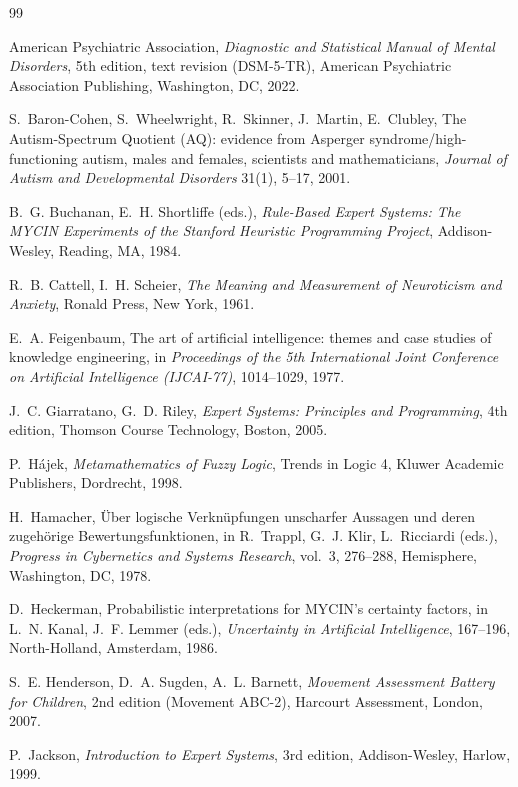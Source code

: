 \begin{thebibliography}{99}

American Psychiatric Association,
\emph{Diagnostic and Statistical Manual of Mental Disorders}, 5th edition, text
revision (DSM-5-TR), American Psychiatric Association Publishing, Washington,
DC, 2022.

S.~Baron-Cohen, S.~Wheelwright, R.~Skinner, J.~Martin, E.~Clubley,
The Autism-Spectrum Quotient (AQ): evidence from Asperger syndrome/high-functioning
autism, males and females, scientists and mathematicians,
\emph{Journal of Autism and Developmental Disorders} 31(1), 5--17, 2001.

B.~G. Buchanan, E.~H. Shortliffe (eds.),
\emph{Rule-Based Expert Systems: The MYCIN Experiments of the Stanford Heuristic
Programming Project}, Addison-Wesley, Reading, MA, 1984.

R.~B. Cattell, I.~H. Scheier,
\emph{The Meaning and Measurement of Neuroticism and Anxiety},
Ronald Press, New York, 1961.

E.~A. Feigenbaum,
The art of artificial intelligence: themes and case studies of knowledge
engineering, in \emph{Proceedings of the 5th International Joint Conference on
Artificial Intelligence (IJCAI-77)}, 1014--1029, 1977.

J.~C. Giarratano, G.~D. Riley,
\emph{Expert Systems: Principles and Programming}, 4th edition,
Thomson Course Technology, Boston, 2005.

P.~H\'ajek,
\emph{Metamathematics of Fuzzy Logic}, Trends in Logic 4,
Kluwer Academic Publishers, Dordrecht, 1998.

H.~Hamacher,
\"Uber logische Verkn\"upfungen unscharfer Aussagen und deren zugeh\"orige
Bewertungsfunktionen, in R.~Trappl, G.~J. Klir, L.~Ricciardi (eds.),
\emph{Progress in Cybernetics and Systems Research}, vol.~3, 276--288,
Hemisphere, Washington, DC, 1978.

D.~Heckerman,
Probabilistic interpretations for MYCIN's certainty factors, in L.~N. Kanal,
J.~F. Lemmer (eds.), \emph{Uncertainty in Artificial Intelligence}, 167--196,
North-Holland, Amsterdam, 1986.

S.~E. Henderson, D.~A. Sugden, A.~L. Barnett,
\emph{Movement Assessment Battery for Children}, 2nd edition (Movement ABC-2),
Harcourt Assessment, London, 2007.

P.~Jackson,
\emph{Introduction to Expert Systems}, 3rd edition, Addison-Wesley, Harlow, 1999.


\end{thebibliography}
